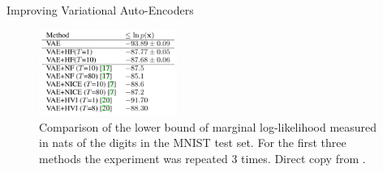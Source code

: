 \begin{frame}{Improving Variational Auto-Encoders}
	\begin{figure}
		\centering
		\includegraphics[width=0.4\textwidth]{houseVAE}
		\caption{Comparison of the lower bound of marginal log-likelihood measured in nats of the digits in the MNIST test set. For the first three methods the experiment was repeated 3 times. \alert{Direct copy from \cite{houseVAE}.}}
	\end{figure}
\end{frame}
